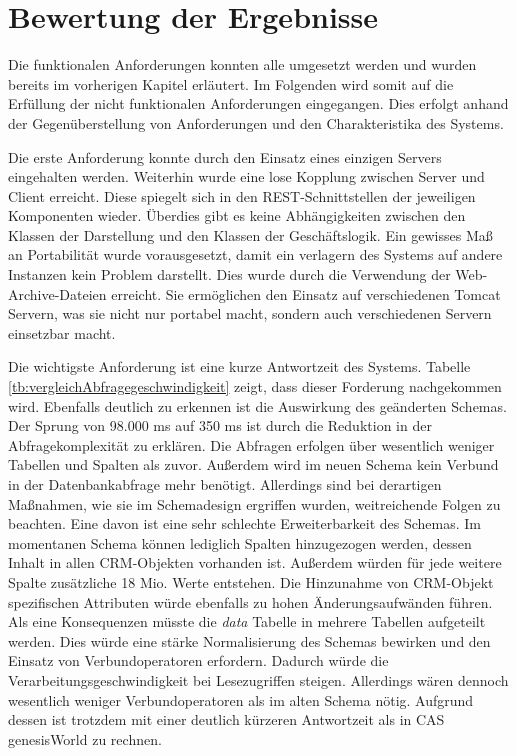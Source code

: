 \section{Bewertung der Ergebnisse}
\label{ch:Ergebnis:sec:bewertung}

Die funktionalen Anforderungen konnten alle umgesetzt werden und wurden bereits im vorherigen Kapitel erläutert. Im Folgenden wird somit auf die Erfüllung der nicht funktionalen Anforderungen eingegangen. Dies erfolgt anhand der Gegenüberstellung von Anforderungen und den Charakteristika des Systems.

Die erste Anforderung konnte durch den Einsatz eines einzigen Servers eingehalten werden. Weiterhin wurde eine lose Kopplung zwischen Server und Client erreicht. Diese spiegelt sich in den REST-Schnittstellen der jeweiligen Komponenten wieder. Überdies gibt es keine Abhängigkeiten zwischen den Klassen der Darstellung und den Klassen der Geschäftslogik. Ein gewisses Maß an Portabilität wurde vorausgesetzt, damit ein verlagern des Systems auf andere Instanzen kein Problem darstellt. Dies wurde durch die Verwendung der Web-Archive-Dateien erreicht. Sie ermöglichen den Einsatz auf verschiedenen Tomcat Servern, was sie nicht nur portabel macht, sondern auch verschiedenen Servern einsetzbar macht. 

Die wichtigste Anforderung ist eine kurze Antwortzeit des Systems. Tabelle \ref{tb:vergleichAbfragegeschwindigkeit} zeigt, dass dieser Forderung nachgekommen wird. Ebenfalls deutlich zu erkennen ist die Auswirkung des geänderten Schemas. Der Sprung von 98.000 ms auf 350 ms ist durch die Reduktion in der Abfragekomplexität zu erklären. Die Abfragen erfolgen über wesentlich weniger Tabellen und Spalten als zuvor. Außerdem wird im neuen Schema kein Verbund in der Datenbankabfrage mehr benötigt. Allerdings sind bei derartigen Maßnahmen, wie sie im Schemadesign ergriffen wurden, weitreichende Folgen zu beachten. Eine davon ist eine sehr schlechte Erweiterbarkeit des Schemas. Im momentanen Schema können lediglich Spalten hinzugezogen werden, dessen Inhalt in allen CRM-Objekten vorhanden ist. Außerdem würden für jede weitere Spalte zusätzliche 18 Mio. Werte entstehen. Die Hinzunahme von CRM-Objekt spezifischen Attributen würde ebenfalls zu hohen Änderungsaufwänden führen. Als eine Konsequenzen müsste die \textit{data} Tabelle in mehrere Tabellen aufgeteilt werden. Dies würde eine stärke Normalisierung des Schemas bewirken und den Einsatz von Verbundoperatoren erfordern. Dadurch würde die Verarbeitungsgeschwindigkeit bei Lesezugriffen steigen. Allerdings wären dennoch wesentlich weniger Verbundoperatoren als im alten Schema nötig. Aufgrund dessen ist trotzdem mit einer deutlich kürzeren Antwortzeit als in CAS genesisWorld zu rechnen.  

